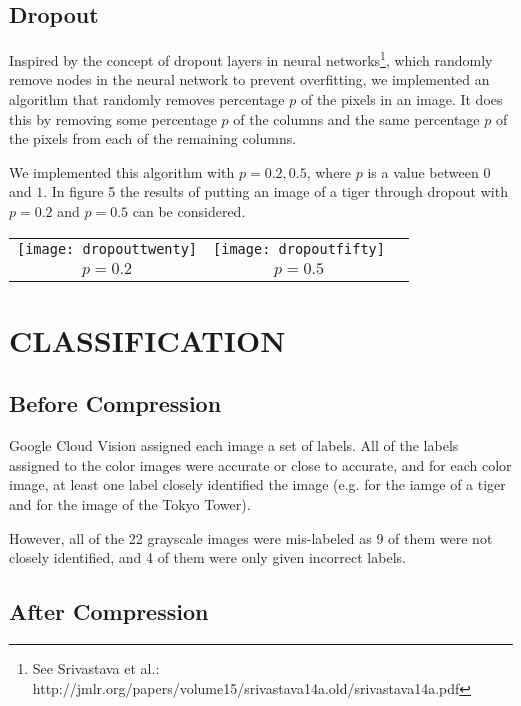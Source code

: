 \subsection{Dropout}
Inspired by the concept of dropout layers in neural networks\footnote{See Srivastava et al.: http://jmlr.org/papers/volume15/srivastava14a.old/srivastava14a.pdf},
which randomly remove nodes in the neural network
to prevent overfitting, we implemented an algorithm
that randomly removes percentage $p$ of the pixels
in an image. It does this by removing
some percentage $p$ of the columns and the same percentage $p$ of the pixels
from each of the remaining columns.

We implemented this algorithm with $p=0.2,0.5$, where $p$ is a value between $0$ and $1$.
In figure 5 the results of putting an image of a tiger through dropout
with $p=0.2$ and $p=0.5$ can be considered.

\vspace*{3mm}
\begin{tabular}{c c c}
	\texttt{[image: dropouttwenty]} &
		\texttt{[image: dropoutfifty]} \\
	$p=0.2$ & $p=0.5$ \\
\end{tabular}

\vspace*{3mm}

\section{CLASSIFICATION}

\subsection{Before Compression}

Google Cloud Vision assigned each image a set of labels.
All of the labels assigned to the color images were
accurate or close to accurate, and for each color image,
at least one label closely identified the image (e.g. 
for the iamge of a tiger and  for the image of
the Tokyo Tower).

However, all of the 22 grayscale images were mis-labeled as  9 of them were not closely identified, and 4 of them
were only given incorrect labels.

\subsection{After Compression}

